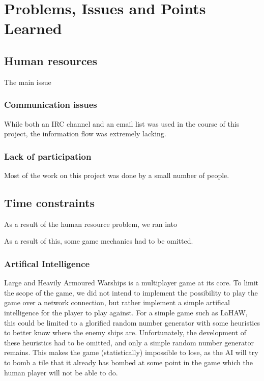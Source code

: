 \chapter{Problems, Issues and Points Learned}
\label{cha:problems_issues_and_points_learned}



\section{Human resources}
The main issue 

\subsection{Communication issues}
While both an IRC channel and an email list was used in the course of this project, the information flow was extremely lacking.

\subsection{Lack of participation}
Most of the work on this project was done by a small number of people.


\section{Time constraints}
As a result of the human resource problem, we ran into 


As a result of this, some game mechanics had to be omitted.

\subsection{Artifical Intelligence}
Large and Heavily Armoured Warships is a multiplayer game at its core. To limit the scope of the game, we did not intend to implement the possibility to play the game over a network connection, but rather implement a simple artifical intelligence for the player to play against. For a simple game such as LaHAW, this could be limited to a glorified random number generator with some heuristics to better know where the enemy ships are. Unfortunately, the development of these heuristics had to be omitted, and only a simple random number generator remains. This makes the game (statistically) impossible to lose, as the AI will try to bomb a tile that it already has bombed at some point in the game which the human player will not be able to do.

